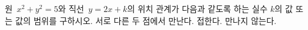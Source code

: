 원~$x^2+y^2=5$와 직선~$y=2x+k$의 위치 관계가 다음과 같도록 하는 실수 $k$의 값 또는 값의 범위를 구하시오.
 서로 다른 두 점에서 만난다.
 접한다.
 만나지 않는다.
